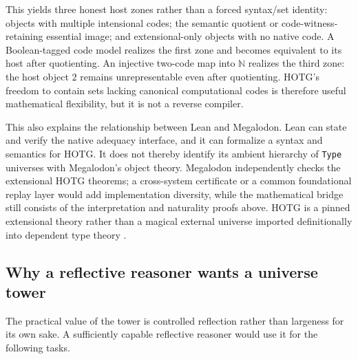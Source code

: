 \documentclass[11pt]{article}
\theoremstyle{definition}
\theoremstyle{remark}
\newcommand{\code}[1]{\texttt{#1}}
\begin{document}
This yields three honest host zones rather than a forced syntax/set identity:
objects with multiple intensional codes; the semantic quotient or
code-witness-retaining essential image; and extensional-only objects with no
native code.  A Boolean-tagged code model realizes the first zone and
becomes equivalent to its host after quotienting.  An injective two-code map
into $\mathbb N$ realizes the third zone: the host object $2$ remains
unrepresentable even after quotienting.  HOTG's freedom to contain sets lacking
canonical computational codes is therefore useful mathematical
flexibility, but it is not a reverse compiler.

This also explains the relationship between Lean and Megalodon.  Lean can state
and verify the native adequacy interface, and it can formalize a syntax and
semantics for HOTG.  It does not thereby identify its ambient hierarchy of
\code{Type} universes with Megalodon's object theory.  Megalodon independently
checks the extensional HOTG theorems; a cross-system certificate or a common
foundational replay layer would add implementation diversity, while the
mathematical bridge still consists of the interpretation and naturality proofs
above.  HOTG is a pinned extensional theory rather than a magical external
universe imported definitionally into dependent type theory
\cite{BrownKaliszykPakHOTG,BrownPakTwoSetTheories}.

\subsection{Why a reflective reasoner wants a universe tower}

The practical value of the tower is controlled reflection rather than largeness
for its own sake.  A sufficiently capable reflective reasoner would use it for
the following tasks.
\end{document}
